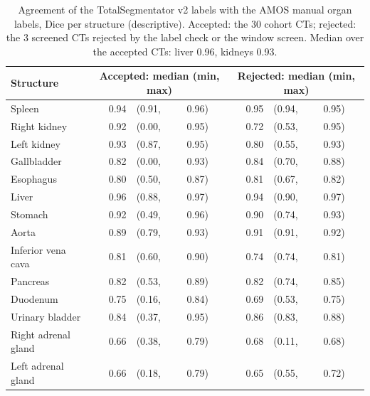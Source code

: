 
\begin{table}[tp]
\renewcommand{\baselinestretch}{1}\scriptsize
\caption{Agreement of the TotalSegmentator v2 labels with the AMOS manual organ labels, Dice per structure (descriptive). Accepted: the 30 cohort CTs; rejected: the 3 screened CTs rejected by the label check or the window screen. Median over the accepted CTs: liver 0.96, kidneys 0.93.}
\label{tab:amos-labels}
\centering
\setlength{\tabcolsep}{3pt}
\begin{tabularx}{\textwidth}{@{}>{\raggedright\arraybackslash}X r l l r l l@{}}
\toprule
Structure & \multicolumn{3}{c}{Accepted: median (min, max)} & \multicolumn{3}{c}{Rejected: median (min, max)} \\
\midrule
\quad Spleen & 0.94 & (0.91, & 0.96) & 0.95 & (0.94, & 0.95) \\
\quad Right kidney & 0.92 & (0.00, & 0.95) & 0.72 & (0.53, & 0.95) \\
\quad Left kidney & 0.93 & (0.87, & 0.95) & 0.80 & (0.55, & 0.93) \\
\quad Gallbladder & 0.82 & (0.00, & 0.93) & 0.84 & (0.70, & 0.88) \\
\quad Esophagus & 0.80 & (0.50, & 0.87) & 0.81 & (0.67, & 0.82) \\
\quad Liver & 0.96 & (0.88, & 0.97) & 0.94 & (0.90, & 0.97) \\
\quad Stomach & 0.92 & (0.49, & 0.96) & 0.90 & (0.74, & 0.93) \\
\quad Aorta & 0.89 & (0.79, & 0.93) & 0.91 & (0.91, & 0.92) \\
\quad Inferior vena cava & 0.81 & (0.60, & 0.90) & 0.74 & (0.74, & 0.81) \\
\quad Pancreas & 0.82 & (0.53, & 0.89) & 0.82 & (0.74, & 0.85) \\
\quad Duodenum & 0.75 & (0.16, & 0.84) & 0.69 & (0.53, & 0.75) \\
\quad Urinary bladder & 0.84 & (0.37, & 0.95) & 0.86 & (0.83, & 0.88) \\
\quad Right adrenal gland & 0.66 & (0.38, & 0.79) & 0.68 & (0.11, & 0.68) \\
\quad Left adrenal gland & 0.66 & (0.18, & 0.79) & 0.65 & (0.55, & 0.72) \\
\bottomrule
\end{tabularx}
\end{table}
